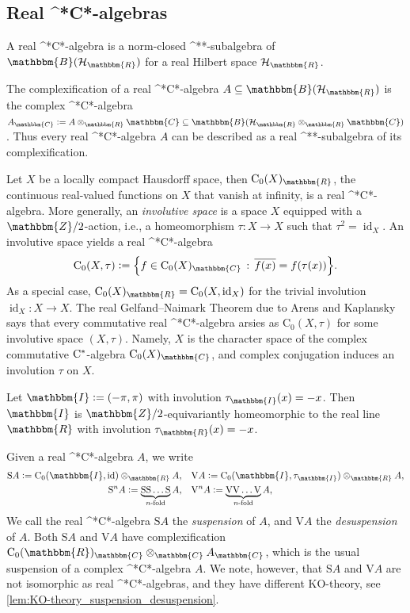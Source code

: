 \documentclass{amsart}
\numberwithin{figure}{section}
\numberwithin{equation}{section}
\numberwithin{table}{section}
\theoremstyle{plain}
\theoremstyle{definition}
\theoremstyle{remark}
\theoremstyle{nonumber}
\newcommand{\Z}{\mathbb{Z}}
\newcommand{\R}{\mathbb{R}}
\newcommand{\C}{\mathbb{C}}
\newcommand{\Bdd}{\mathbb{B}}
\newcommand{\I}{\mathbb{I}} %
\newcommand{\st}{\relax\ifmmode{}^*\else{}\textup{*}\fi}
\newcommand{\Cst}{\relax\ifmmode\mathrm{C}^*\else\textup{C*}\fi}
\newcommand{\Co}{\mathrm{C}_0}
\newcommand{\id}{\operatorname{id}} %
\newcommand{\defeq}{\mathrel{\vcentcolon=}}
\renewcommand{\mathbb}{\mathbbm} %
\DeclarePairedDelimiter{\set}{\lbrace}{\rbrace} %
\begin{document}
\subsection{Real \Cst-algebras}
A real \Cst-algebra is a norm-closed \st-subalgebra of \(
\Bdd(\mathcal{H}_\R) \) for a real Hilbert space \( \mathcal{H}_\R \). 

The complexification of a real \Cst-algebra \( A\subseteq
\Bdd(\mathcal{H}_\R) \) is the complex \Cst-algebra \( A_\C\defeq
A\otimes_\R\C\subseteq \Bdd(\mathcal{H}_\R\otimes_\R\C) \). Thus 
every real \Cst-algebra \( A \) can be described as a 
real \st-subalgebra of its complexification.

Let \( X \) be a locally compact Hausdorff space, then \( \Co(X)_\R \), the
continuous real-valued functions on \( X \) that vanish at infinity, is a
real \Cst-algebra. More generally, 
an \emph{involutive space} is a space \( X \) equipped with a 
\( \Z/2 \)-action, i.e., a homeomorphism \( \tau\colon X\to X \) such that
\( \tau^2=\id_X \). An involutive space yields a real \Cst-algebra  
\[ 
  \Co(X,\tau)\defeq
  \set*{f\in\Co(X)_\C\,:\,\overline{f(x)}=f(\tau(x))}.
\]
As a special case, \( \Co(X)_\R=\Co(X,\id_X) \) for the trivial involution
\( \id_X\colon X\to X \). The real Gelfand--Naimark Theorem due to Arens
and Kaplansky \cite{Arens_Kaplansky:Topological_representation} says that
every commutative real \Cst-algebra arsies as \( \Co(X,\tau) \) for some
involutive space \( (X,\tau) \). Namely, $X$ is the character space of
the complex commutative $\Cst$-algebra $\Co(X)_{\C}$, and complex
conjugation induces an involution $\tau$ on $X$.

Let \( \I\defeq (-\pi,\pi) \) with involution \( \tau_{\I}(x)=-x \).
Then \( \I \) is \( \Z/2 \)-equivariantly homeomorphic to the real
line \( \R \) with involution \( \tau_\R(x)=-x \).

Given a real \Cst-algebra \( A \), we write
\begin{equation}\label{eq:suspension_desuspension_real}
\begin{aligned} 
\mathrm{S}A\defeq \Co(\I,\id)\otimes_\R A,&\quad
\mathrm{V}A\defeq \Co(\I,\tau_{\I})\otimes_\R A,\\
\mathrm{S}^nA\defeq
\underbrace{\mathrm{S}\mathrm{S}\dots\mathrm{S}}_{\text{\( n \)-fold}}A,
&\quad \mathrm{V}^nA\defeq
\underbrace{\mathrm{V}\mathrm{V}\dots\mathrm{V}}_{\text{\( n \)-fold}}A,
\end{aligned}
\end{equation}
We call the real \Cst-algebra \( \mathrm{S}A \) the \emph{suspension} of
\( A \), and \( \mathrm{V}A \) the \emph{desuspension} of \( A \).
Both \( \mathrm{S}A \) and \( \mathrm{V}A \) have complexification \(
\Co(\R)_\C\otimes_\C A_\C \), which is the usual suspension of a complex
\Cst-algebra \( A \). We note, however, that \( \mathrm{S}A \) and \(
\mathrm{V}A \) are not isomorphic as real \Cst-algebras, and they have
different KO-theory, see \cref{lem:KO-theory_suspension_desuspension}.
\end{document}
